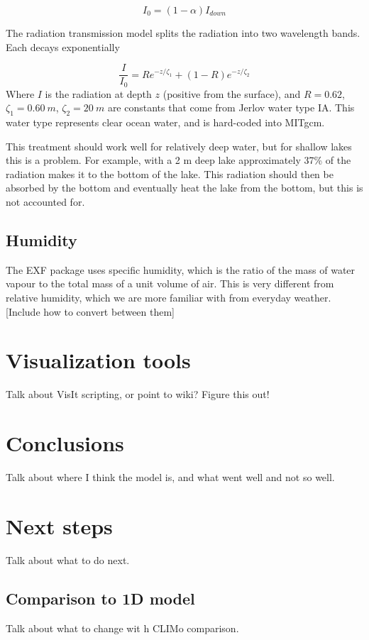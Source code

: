 \documentclass[11pt]{article}
\begin{document}
\begin{equation}
I_0 = (1 - \alpha) I_{down}
\end{equation}

The radiation transmission model \cite{PaulsonSimpson1977} splits the radiation into two wavelength bands. Each decays exponentially

\begin{equation}
\frac{I}{I_0} = R e^{-z/\zeta_1} + (1 - R) e^{-z/\zeta_2}
\end{equation}
Where $I$ is the radiation at depth $z$ (positive from the surface), and $R = 0.62$, $\zeta_1 = \SI{0.60}{m}$, $\zeta_2 = \SI{20}{m}$ are constants that come from Jerlov water type IA. This water type represents clear ocean water, and is hard-coded into MITgcm.

This treatment should work well for relatively deep water, but for shallow lakes this is a problem. For example, with a 2 m deep lake approximately 37\% of the radiation makes it to the bottom of the lake. This radiation should then be absorbed by the bottom and eventually heat the lake from the bottom, but this is not accounted for.

\subsection{Humidity}
The EXF package uses specific humidity, which is the ratio of the mass of water vapour to the total mass of a unit volume of air. This is very different from relative humidity, which we are more familiar with from everyday weather. [Include how to convert between them]

\section{Visualization tools}
Talk about VisIt scripting, or point to wiki? Figure this out!

\section{Conclusions}
Talk about where I think the model is, and what went well and not so well.

\section{Next steps}
Talk about what to do next.

\subsection{Comparison to 1D model}
Talk about what to change wit h CLIMo comparison.
\end{document}
